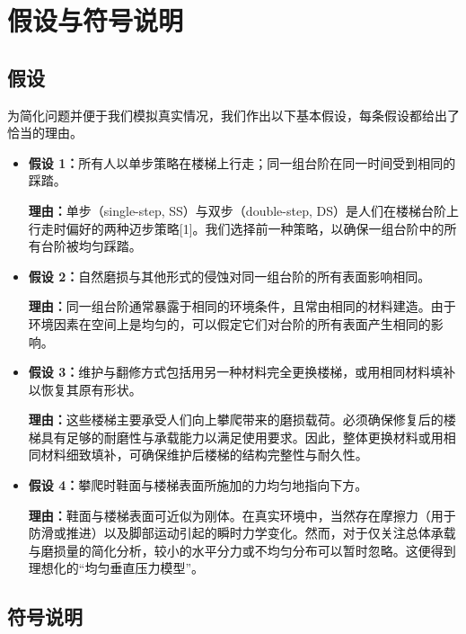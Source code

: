 \documentclass[11pt,a4paper]{ctexart}
\begin{document}
\section{假设与符号说明}

\subsection{假设}

为简化问题并便于我们模拟真实情况，我们作出以下基本假设，每条假设都给出了恰当的理由。

\begin{itemize}
\item \textbf{假设 1：}所有人以单步策略在楼梯上行走；同一组台阶在同一时间受到相同的踩踏。

\textbf{理由：}单步（single-step, SS）与双步（double-step, DS）是人们在楼梯台阶上行走时偏好的两种迈步策略[1]。我们选择前一种策略，以确保一组台阶中的所有台阶被均匀踩踏。

\item \textbf{假设 2：}自然磨损与其他形式的侵蚀对同一组台阶的所有表面影响相同。

\textbf{理由：}同一组台阶通常暴露于相同的环境条件，且常由相同的材料建造。由于环境因素在空间上是均匀的，可以假定它们对台阶的所有表面产生相同的影响。

\item \textbf{假设 3：}维护与翻修方式包括用另一种材料完全更换楼梯，或用相同材料填补以恢复其原有形状。

\textbf{理由：}这些楼梯主要承受人们向上攀爬带来的磨损载荷。必须确保修复后的楼梯具有足够的耐磨性与承载能力以满足使用要求。因此，整体更换材料或用相同材料细致填补，可确保维护后楼梯的结构完整性与耐久性。

\item \textbf{假设 4：}攀爬时鞋面与楼梯表面所施加的力均匀地指向下方。

\textbf{理由：}鞋面与楼梯表面可近似为刚体。在真实环境中，当然存在摩擦力（用于防滑或推进）以及脚部运动引起的瞬时力学变化。然而，对于仅关注总体承载与磨损量的简化分析，较小的水平分力或不均匀分布可以暂时忽略。这便得到理想化的“均匀垂直压力模型”。
\end{itemize}

\subsection{符号说明}
\end{document}
